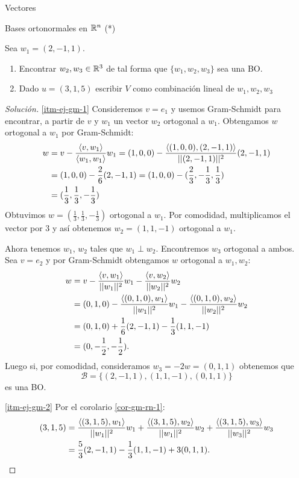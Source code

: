 \begin{chapter}{Vectores}
\begin{section}{Bases ortonormales en $\mathbb R^n$ (*)}
\begin{ejemplo*}
    Sea $w_1= (2,-1,1)$. 
    \begin{enumerate}
        \item\label{itm-ej-gm-1} Encontrar $w_2,w_3 \in \mathbb R^3$ de tal forma que  $\{w_1,w_2,w_3 \}$ sea una BO. 
        \item\label{itm-ej-gm-2} Dado $u = (3,1,5)$ escribir $V$ como combinación lineal de $w_1,w_2,w_3$
    \end{enumerate}
\end{ejemplo*}
\begin{proof}[Solución] \ref{itm-ej-gm-1}
    Consideremos $v=e_1$ y usemos Gram-Schmidt para encontrar,  a partir de $v$ y $w_1$ un vector $w_2$ ortogonal a $w_1$. Obtengamos $w$ ortogonal a $w_1$ por Gram-Schmidt:
    \begin{align*}
        w &= v - \frac{\langle v,w_1\rangle}{\langle w_1,w_1\rangle}w_1  = (1,0,0) - \frac{\langle (1,0,0),(2,-1,1)\rangle}{||(2,-1,1)||^2}(2,-1,1) \\
        &=  (1,0,0) - \frac{2}{6}(2,-1,1) =  (1,0,0) - (\frac{2}{3},-\frac{1}{3},\frac{1}{3})\\
        &=(\frac{1}{3}, \frac{1}{3}, -\frac{1}{3})
    \end{align*}
    Obtuvimos $w = (\frac{1}{3}, \frac{1}{3}, -\frac{1}{3})$ ortogonal a $w_1$. Por  comodidad, multiplicamos el vector por $3$ y así obtenemos $w_2 = (1,1,-1)$ ortogonal a $w_1$. 

    Ahora tenemos $w_1$, $w_2$ tales que $w_1 \perp w_2$. Encontremos $w_3$ ortogonal a ambos. Sea  $v = e_2$ y  por Gram-Schmidt obtengamos $w$ ortogonal a $w_1,w_2$:
    \begin{align*}
        w&= v - \frac{\langle v,w_1\rangle}{||w_1||^2}w_1- \frac{\langle v,w_2\rangle}{||w_2||^2}w_2 \\
        &= (0,1,0) - \frac{\langle (0,1,0),w_1\rangle}{||w_1||^2}w_1- \frac{\langle (0,1,0), w_2\rangle}{||w_2||^2} w_2\\
        &= (0,1,0) + \frac{1}{6}(2,-1,1)- \frac{1}{3} (1,1,-1)  \\
        &= (0,-\frac{1}{2},-\frac{1}{2}).
       \end{align*}
       Luego si, por comodidad, consideramos $w_3 = -2w =(0,1,1)$ obtenemos que 
       \begin{equation*}
           \mathcal B = \{(2,-1,1),  (1,1,-1), (0,1,1) \}
       \end{equation*}
       es una BO. 

       \ref{itm-ej-gm-2} Por  el corolario \ref{cor-gm-rn-1}:
       \begin{align*}
        (3,1,5) &= \frac{\langle (3,1,5),w_1\rangle}{ ||w_1||^2} w_1 +\frac{\langle (3,1,5),w_2\rangle}{||w_1||^2} w_2 +\frac{\langle (3,1,5),w_3\rangle}{||w_3||^2} w_3 \\
        &=  \frac{5}{3} (2,-1,1) -\frac{1}{3} (1,1,-1) + 3 (0,1,1). 
       \end{align*}
\end{proof}



\end{section}
\end{chapter}
